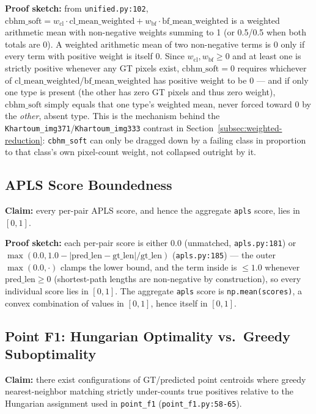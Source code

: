 \textbf{Proof sketch:} from \texttt{unified.py:102}, $\mathrm{cbhm\_soft} = w_{\mathrm{cl}} \cdot
\mathrm{cl\_mean\_weighted} + w_{\mathrm{bf}} \cdot \mathrm{bf\_mean\_weighted}$ is a weighted
arithmetic mean with non-negative weights summing to 1 (or 0.5/0.5 when both totals are 0). A
weighted arithmetic mean of two non-negative terms is 0 only if every term with positive weight is
itself 0. Since $w_{\mathrm{cl}}, w_{\mathrm{bf}} \ge 0$ and at least one is strictly positive
whenever any GT pixels exist, $\mathrm{cbhm\_soft}=0$ requires whichever of
$\mathrm{cl\_mean\_weighted}$/$\mathrm{bf\_mean\_weighted}$ has positive weight to be 0 --- and if
only one type is present (the other has zero GT pixels and thus zero weight),
$\mathrm{cbhm\_soft}$ simply equals that one type's weighted mean, never forced toward 0 by the
\emph{other}, absent type. This is the mechanism behind the
\texttt{Khartoum\_img371}/\texttt{Khartoum\_img333} contrast in Section~\ref{subsec:weighted-reduction}:
\texttt{cbhm\_soft} can only be dragged down by a failing class in proportion to that class's own
pixel-count weight, not collapsed outright by it.

\subsection{APLS Score Boundedness}
\label{app:a5}

\textbf{Claim:} every per-pair APLS score, and hence the aggregate \texttt{apls} score, lies in
$[0,1]$.

\textbf{Proof sketch:} each per-pair score is either $0.0$ (unmatched, \texttt{apls.py:181}) or
$\max(0.0, 1.0 - |\mathrm{pred\_len} - \mathrm{gt\_len}|/\mathrm{gt\_len})$
(\texttt{apls.py:185}) --- the outer $\max(0.0, \cdot)$ clamps the lower bound, and the term
inside is $\le 1.0$ whenever $\mathrm{pred\_len} \ge 0$ (shortest-path lengths are non-negative by
construction), so every individual score lies in $[0,1]$. The aggregate \texttt{apls} score is
\texttt{np.mean(scores)}, a convex combination of values in $[0,1]$, hence itself in $[0,1]$.

\subsection{Point F1: Hungarian Optimality vs.\ Greedy Suboptimality}
\label{app:a6}

\textbf{Claim:} there exist configurations of GT/predicted point centroids where greedy
nearest-neighbor matching strictly under-counts true positives relative to the Hungarian
assignment used in \texttt{point\_f1} (\texttt{point\_f1.py:58-65}).

